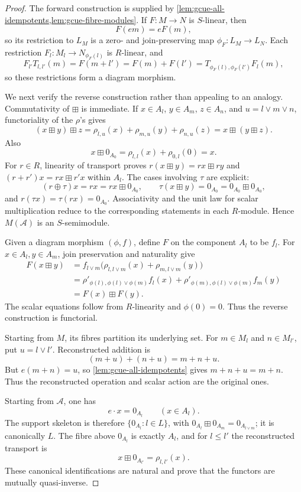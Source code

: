 \begin{proof}
The forward construction is supplied by
\cref{lem:gcue-all-idempotents,lem:gcue-fibre-modules}.  If
$F:M\to N$ is $S$-linear, then
\[
 F(em)=eF(m),
\]
so its restriction to $L_M$ is a zero- and join-preserving map
$\phi_F:L_M\to L_N$.  Each restriction
$F_l:M_l\to N_{\phi_F(l)}$ is $R$-linear, and
\[
 F_{l'}T_{l,l'}(m)=F(m+l')=F(m)+F(l')
 =T_{\phi_F(l),\phi_F(l')}F_l(m),
\]
so these restrictions form a diagram morphism.

We next verify the reverse construction rather than appealing to an analogy.  Commutativity
of $\boxplus$ is immediate.  If $x\in A_l$, $y\in A_m$, $z\in A_n$, and
$u=l\vee m\vee n$, functoriality of the $\rho$'s gives
\[
 (x\boxplus y)\boxplus z
 =\rho_{l,u}(x)+\rho_{m,u}(y)+\rho_{n,u}(z)
 =x\boxplus(y\boxplus z).
\]
Also
\[
 x\boxplus0_{A_0}=\rho_{l,l}(x)+\rho_{0,l}(0)=x.
\]
For $r\in R$, linearity of transport proves
$r(x\boxplus y)=rx\boxplus ry$ and
$(r+r')x=rx\boxplus r'x$ within $A_l$.  The cases involving $\tau$ are explicit:
\[
 (r\oplus\tau)x=rx=rx\boxplus0_{A_0},
 \qquad
 \tau(x\boxplus y)=0_{A_0}=0_{A_0}\boxplus0_{A_0},
\]
and $r(\tau x)=\tau(rx)=0_{A_0}$.  Associativity and the unit law for scalar
multiplication reduce to the corresponding statements in each $R$-module.  Hence
$M(\mathcal A)$ is an $S$-semimodule.

Given a diagram morphism $(\phi,f)$, define $F$ on the component $A_l$ to be $f_l$.
For $x\in A_l,y\in A_m$, join preservation and naturality give
\begin{align*}
 F(x\boxplus y)
 &=f_{l\vee m}\bigl(\rho_{l,l\vee m}(x)+\rho_{m,l\vee m}(y)\bigr)\\
 &=\rho'_{\phi(l),\phi(l)\vee\phi(m)}f_l(x)
   +\rho'_{\phi(m),\phi(l)\vee\phi(m)}f_m(y)\\
 &=F(x)\boxplus F(y).
\end{align*}
The scalar equations follow from $R$-linearity and $\phi(0)=0$.  Thus the reverse
construction is functorial.

Starting from $M$, its fibres partition its underlying set.  For $m\in M_l$ and
$n\in M_{l'}$, put $u=l\vee l'$.  Reconstructed addition is
\[
 (m+u)+(n+u)=m+n+u.
\]
But $e(m+n)=u$, so \cref{lem:gcue-all-idempotents} gives $m+n+u=m+n$.
Thus the reconstructed operation and scalar action are the original ones.

Starting from $\mathcal A$, one has
\[
 e\cdot x=0_{A_l}\qquad(x\in A_l).
\]
The support skeleton is therefore $\{0_{A_l}:l\in L\}$, with
$0_{A_l}\boxplus0_{A_m}=0_{A_{l\vee m}}$; it is canonically $L$.  The fibre above
$0_{A_l}$ is exactly $A_l$, and for $l\le l'$ the reconstructed transport is
\[
 x\boxplus0_{A_{l'}}=\rho_{l,l'}(x).
\]
These canonical identifications are natural and prove that the functors are mutually
quasi-inverse.
\end{proof}


